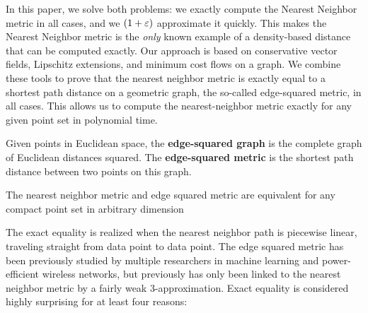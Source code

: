 In this paper, we solve both problems: we exactly compute the Nearest
Neighbor metric in all cases, and we $(1+\varepsilon)$ approximate it quickly.
This makes the Nearest Neighbor metric is the \textit{only} known example
of a density-based distance that can be computed exactly.  Our approach is
based on conservative vector fields, Lipschitz extensions, and minimum cost
flows on a graph. We combine these tools to prove that the nearest neighbor
metric is exactly equal to a shortest path distance on a geometric graph,
the so-called edge-squared metric, in all cases. This allows us to compute
the nearest-neighbor metric exactly for any given point set in polynomial
time.


\begin{definition} Given points in Euclidean space, the
\textbf{edge-squared graph} is the complete graph of Euclidean distances
squared. The \textbf{edge-squared metric} is the shortest path distance
between two points on this graph. \end{definition}

\begin{theorem}\label{thm:NN} The nearest neighbor metric and edge squared
metric are equivalent for any compact point set in arbitrary dimension
\end{theorem}

The exact equality is realized when the nearest neighbor path is piecewise
linear, traveling straight from data point to data point. The edge squared
metric has been previously studied by multiple researchers in machine
learning and power-efficient wireless networks, but previously has only
been linked to the nearest neighbor metric by a fairly weak
3-approximation. Exact equality is considered highly surprising for at
least four reasons:

